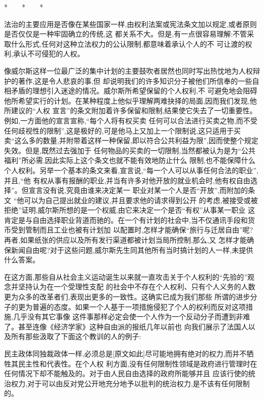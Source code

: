 ﻿\documentclass[12pt]{article}
\begin{document}
*　　*　　*

法治的主要应用是否像在某些国家一样,由权利法案或宪法条文加以规定,或者原则是否仅仅是一种牢固确立的传统,这
都关系不大。但是,有一点很容易理解:不管采取什么形式,任何对这种立法权力的公认限制,都意味着承认个人的不
可让渡的权利,承认不可侵犯的人权。

像威尔斯这样一位最广泛的集中计划的主要鼓吹者居然也同时写出热忱地为人权辩护的著作,这是令人悲哀的事,但
却说明我们的许多知识分子被他们所信奉的一些自相矛盾的理想引入迷途的情况。威尔斯所希望保留的个人权利,不
可避免地会阻碍他所希望实行的计划。在某种程度上他似乎理解两难抉择的局面,因而我们发现,他所建议的``人权
宣言''的条文附加着许多保留和限制,结果使它失去了一切重要性。例如,一方面他的宣言宣称,``每个人将有权买卖
任何可以合法进行买卖之物,而不受任何歧视性的限制'',这是极好的,可是他马上又加上一个限制说,这只适用于买
卖``这么多的数量,并附带着这样一种保留,即以符合公共利益为限'',因而使整个规定失效。但是,既然过去强加于
任何物品的买卖的一切限制,当然都被认为是为``公共福利''所必需,因此实际上这个条文也就不能有效地防止什么
限制,也不能保障什么个人权利。另举一个基本的条文来看,宣言说,``每一个人可以从事任何合法的职业'',并且,``他
有权从事有报酬的职业,并当有许多对他开放的就业机会时,他有权自由选择''。但宣言没有说,究竟由谁来决定某一
职业对某一个人是否``开放'',而附加的条文 \myrule ``他可以为自己提出就业的建议,并且要求他的请求得到公开
的考虑,被接受或被拒绝''证明,威尔斯所想的是一个权威,由它来决定一个是否``有权''从事某一职业 \myrule 这
肯定是与自由选择职业背道而驰的。在一个有计划的社会中,当不仅通讯手段和货币受到管制而且工业也被有计划加
以配置时,怎样才能确保``旅行与迁居自由''呢?再者,如果纸张的供应以及所有发行渠道都被计划当局所控制,那么,又
怎样才能确保新闻自由呢?对于这些问题,威尔斯先生同其他所有当时搞计划的人一样,未提供什么答案。

在这方面,那些自从社会主义运动诞生以来就一直攻击关于个人权利的``先验的''观念并坚持认为在一个受理性支配
的社会中不存在个人权利、只有个人义务的人数更为众多的改革者们,表现出更多的一致性。这确实已成为我们那些
所谓的进步分子的更为普遍的态度。如果一个人基于一项措施侵犯了个人的权利而反对这项措施,几乎没有其它事像
这件事那样必定会使一个人作为一个反动分子而遭到非难了。甚至连像《经济学家》这种自由派的报纸几年以前也
向我们展示了法国人以及所有那些汲取了下面这个教训的人的例子:

民主政体同独裁政体一样,必须总是[原文如此]尽可能地拥有绝对的权力,而并不牺牲其民主性和代表性。在个人权
利方面,没有任何限制性领域是政府进行管理时在任何情况下却不能触及的。对于由人民自由选择的政府所能够并且
应该行使的统治权力,对于可以由反对党公开地充分地予以批判的统治权力,是不该有任何限制的。
\end{document}
